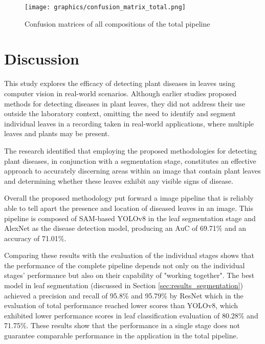 \documentclass[draft,final]{vutinfth} %
\begin{document}
\begin{figure}
    \centering
    \texttt{[image: graphics/confusion\_matrix\_total.png]}
    \caption{Confusion matrices of all compositions of the total pipeline}
    \label{fig:confusion_matrix_total}
\end{figure}
\fi

\chapter{Discussion}
This study explores the efficacy of detecting plant diseases in leaves using computer vision in real-world scenarios. Although earlier studies proposed methods for detecting diseases in plant leaves, they did not address their use outside the laboratory context, omitting the need to identify and segment individual leaves in a recording taken in real-world applications, where multiple leaves and plants may be present. 

The research identified that employing the proposed methodologies for detecting plant diseases, in conjunction with a segmentation stage, constitutes an effective approach to accurately discerning areas within an image that contain plant leaves and determining whether these leaves exhibit any visible signs of disease.

Overall the proposed methodology put forward a image pipeline that is reliably able to tell apart the presence and location of diseased leaves in an image. This pipeline is composed of SAM-based YOLOv8 in the leaf segmentation stage and AlexNet as the disease detection model, producing an AuC of 69.71\% and an accuracy of 71.01\%.

Comparing these results with the evaluation of the individual stages shows that the performance of the complete pipeline depends not only on the individual stages' performance but also on their capability of "working together". The best model in  leaf segmentation (discussed in Section \ref{sec:results_segmentation}) achieved a precision and recall of 95.8\% and 95.79\% by ResNet which in the evaluation of total performance reached lower scores than YOLOv8, which exhibited lower performance scores in leaf classification evaluation of 80.28\% and 71.75\%. These results show that the performance in a single stage does not guarantee comparable performance in the application in the total pipeline.
\end{document}
